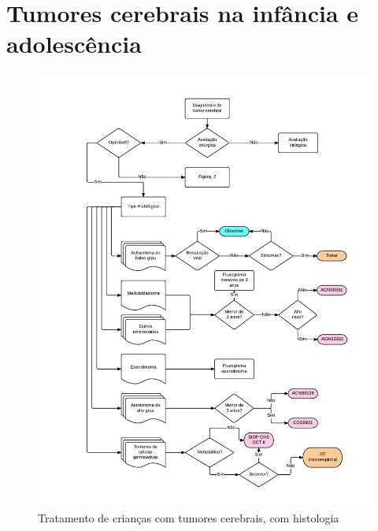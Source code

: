 \documentclass[11pt,a4paper,oldfontcommands]{memoir}
\begin{document}
\section{Tumores cerebrais na infância e adolescência}
\begin{center}
\begin{figure}[htpb]
\includegraphics[scale=0.9,trim = 30mm 10mm 8mm 15mm,clip]{fig/fig1.pdf}
\caption{Tratamento de crianças com tumores cerebrais, com histologia}
\end{figure}
\begin{figure}[!htb]

\end{figure}
\end{center}
\end{document}
